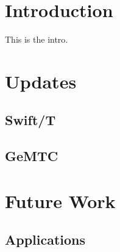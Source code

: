 \documentclass[conference]{IEEEtran}
\begin{document}
\section{Introduction}
This is the intro. \cite{kriederSC12}

\section{Updates}

\subsection{Swift/T}

\subsection{GeMTC}

\section{Future Work}

\subsection{Applications}



\end{document}
